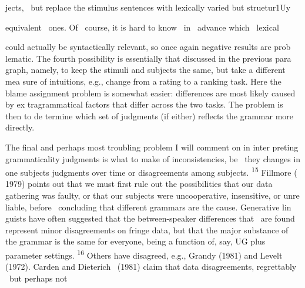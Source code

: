 \begin{styleStandard}
jects, \ but replace the stimulus sentences with lexically varied but struetur1Uy
\end{styleStandard}


\begin{styleStandard}
equivalent \ ones. Of \ course, it is hard to know \ in \ advance which \ lexical
\end{styleStandard}


\begin{styleStandard}
could actually be syntactically relevant, so once again negative results are prob lematic. The fourth possibility is essentially that discussed in the previous para\- graph, namely, to keep the stimuli and subjects the same, but take a different mea\- sure of intuitions, e.g., change from a rating to a ranking task. Here the blame assignment problem is somewhat easier: differences are most likely caused by ex\- tragrammatical factors that differ across the two tasks. The problem is then to de\- termine which set of judgments (if either) reflects the grammar more directly.
\end{styleStandard}


\begin{styleStandard}
The final and perhaps most troubling problem I will comment on in inter\- preting grammaticality judgments is what to make of inconsistencies, be \ they changes in one subject{\textquotesingle}s judgments over time or disagreements among subjects. \textsuperscript{15}\textsuperscript{ }Fillmore ( 1979) points out that we must first rule out the possibilities that our data gathering was faulty, or that our subjects were uncooperative, insensitive, or unre\- liable, before \ concluding that different grammars are the cause. Generative lin\- guists have often suggested that the between-speaker differences that \ are found represent minor disagreements on fringe data, but that the major substance of the grammar is the same for everyone, being a function of, say, UG plus parameter settings. \textsuperscript{16}\textsuperscript{ }Others have disagreed, e.g., Grandy (1981) and Levelt (1972). Carden and Dieterich \ (1981) claim that {\textquotedbl}data disagreements, regrettably \ but perhaps not
\end{styleStandard}


